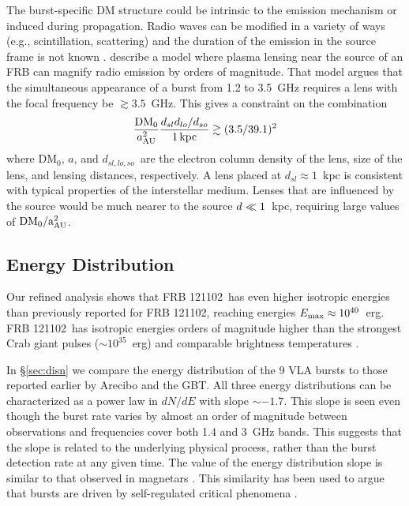\documentclass[twocolumn]{aastex61}
\newcommand{\frb}{FRB 121102}
\begin{document}
The burst-specific DM structure could be intrinsic to the emission mechanism or induced during propagation. Radio waves can be modified in a variety of ways (e.g., scintillation, scattering) and the duration of the emission in the source frame is not known \citep{2016arXiv160505890C}. \citet{CORDES} describe a model where plasma lensing near the source of an FRB can magnify radio emission by orders of magnitude. That model argues that the simultaneous appearance of a burst from 1.2 to 3.5~GHz requires a lens with the focal frequency be $\gtrsim 3.5$~GHz. This gives a constraint on the combination 
$$\frac{\rm DM_0}{a_{\rm AU}^2} \frac{d_{sl}d_{lo}/d_{so}}{1\, \rm kpc} \gtrsim (3.5 / 39.1)^2$$
where DM$_0$, $a$, and $d_{sl, lo, so}$\ are the electron column density of the lens, size of the lens, and lensing distances, respectively. A lens placed at $d_{sl}\approx1$~kpc is consistent with typical properties of the interstellar medium. Lenses that are influenced by the source would be much nearer to the source $d_{\sl} \ll 1$~kpc, requiring large values of $\rm{DM_0}/a_{\rm AU}^2$.

\subsection{Energy Distribution}


Our refined analysis shows that \frb\ has even higher isotropic energies than previously reported for \frb, reaching energies $E_{\rm{max}}\approx10^{40}$\ erg. \frb\ has isotropic energies orders of magnitude higher than the strongest Crab giant pulses ($\sim10^{35}$~erg) and comparable brightness temperatures \citep[$T_{b,\rm{Crab}}\sim10^{41}$~K versus $T_{b, \rm{FRB 121102}}\sim10^{38}$~K;][]{2003Natur.422..141H,2014PhRvD..89j3009K}. 

In \S \ref{sec:disn} we compare the energy distribution of the 9 VLA bursts to those reported earlier by Arecibo and the GBT. All three energy distributions can be characterized as a power law in $dN/dE$ with slope $\sim-1.7$. This slope is seen even though the burst rate varies by almost an order of magnitude between observations and frequencies cover both 1.4 and 3~GHz bands. This suggests that the slope is related to the underlying physical process, rather than the burst detection rate at any given time. The value of the energy distribution slope is similar to that observed in magnetars \citep{2000ApJ...532L.121G, 2011ApJ...739...94S}. This similarity has been used to argue that bursts are driven by self-regulated critical phenomena \citep[slope$=-5/3$;][]{2011SoPh..274...99A}.
\end{document}
